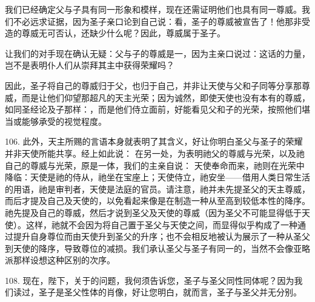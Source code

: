 \par

我们已经确定父与子具有同一形象和模样，现在还需证明他们也具有同一尊威。我们不必远求证据，因为圣子亲口论到自己说：看，圣子的尊威被宣告了！他那非受造的尊威无可否认，还缺少什么呢？因此，尊威属于圣子。\par

让我们的对手现在确认无疑：父与子的尊威是一，因为主亲口说过：这话的力量，岂不是表明仆人们从崇拜其主中获得荣耀吗？\par

因此，圣子将自己的尊威归于父，也归于自己，并非让天使与父和子同等分享那尊威，而是让他们仰望那超凡的天主光荣；因为诚然，即使天使也没有本有的尊威，如同圣经论及子那样：，而是他们侍立面前，好能看见父和子的光荣，按照他们堪当或能够承受的视觉程度。\par

106. 此外，天主所赐的言语本身就表明了其含义，好让你明白圣父与圣子的荣耀并非天使所能共享。经上如此说： 在另一处，为表明祂父的尊威与光荣，以及祂自己的尊威与光荣，原是一体，我们的主亲自说： 天使奉命而来，祂则在光荣中降临：天使是祂的侍从，祂坐在宝座上；天使侍立，祂安坐——借用人类日常生活的用语，祂是审判者，天使是法庭的官员。请注意，祂并未先提圣父的天主尊威，而后才提及自己及天使的，以免看起来像是在制造一种从至高到较低本性的降序。祂先提及自己的尊威，然后才说到圣父及天使的尊威（因为圣父不可能显得低于天使）。这样，祂就不会因为将自己置于圣父与天使之间，而显得似乎构成了一种通过提升自身尊位而由天使升到圣父的升序；也不会相反地被认为展示了一种从圣父到天使的降序，导致尊位的减损。我们承认圣父与圣子有同一的，当然不会像亚略派那样设想这种区别的次序。\par

\par

108. 现在，陛下，关于的问题，我何须告诉您，圣子与圣父同性同体呢？因为我们读过，圣子是圣父性体的肖像，好让您明白，就而言，圣子与圣父并无分别。\par


